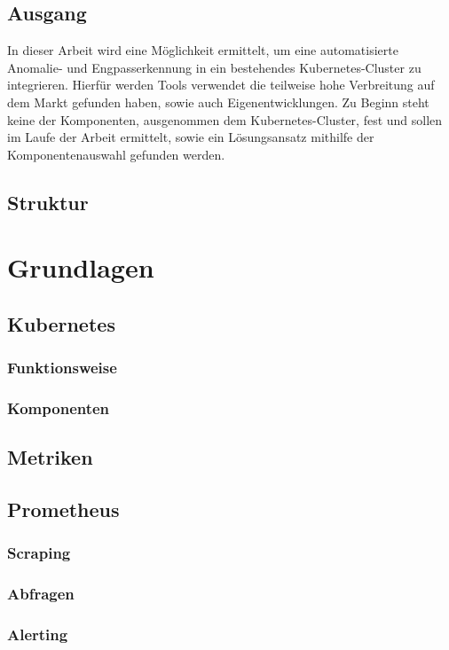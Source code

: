 \documentclass[a4paper,12pt]{scrartcl}
\begin{document}
\subsection{Ausgang}

In dieser Arbeit wird eine Möglichkeit ermittelt, um eine automatisierte Anomalie- und Engpasserkennung in ein bestehendes Kubernetes-Cluster zu integrieren. Hierfür werden Tools verwendet die teilweise hohe Verbreitung auf dem Markt gefunden haben, sowie auch Eigenentwicklungen. Zu Beginn steht keine der Komponenten, ausgenommen dem Kubernetes-Cluster, fest und sollen im Laufe der Arbeit ermittelt, sowie ein Lösungsansatz mithilfe der Komponentenauswahl gefunden werden.

\subsection{Struktur}

\section{Grundlagen}
\subsection{Kubernetes}
\subsubsection{Funktionsweise}
\subsubsection{Komponenten}
\subsection{Metriken}
\subsection{Prometheus}
\subsubsection{Scraping}
\subsubsection{Abfragen}
\subsubsection{Alerting}
\end{document}
